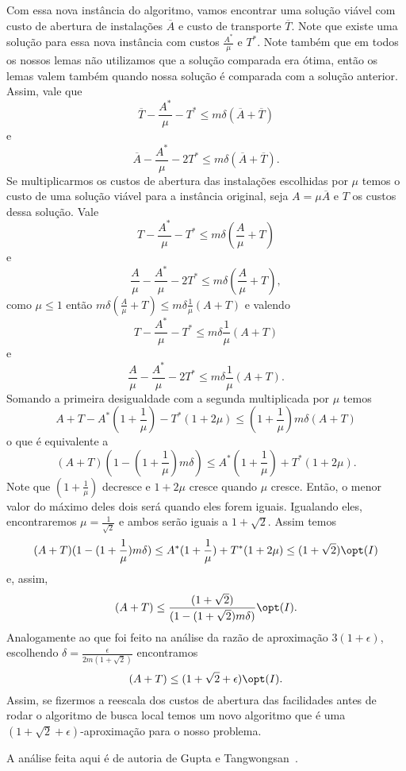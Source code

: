 Com essa nova instância do algoritmo, vamos encontrar uma solução viável com custo de abertura de instalações $\overline{A}$ e custo de transporte $\overline{T}$. Note que existe uma solução para essa nova instância com custos $\frac{A^*}{\mu}$ e $T^*$. Note também que em todos os nossos lemas não utilizamos  que a solução comparada era ótima, então os lemas valem também quando nossa solução é comparada com a solução anterior. Assim, vale que
\[ \overline{T} - \frac{A^*}{\mu} - T^* \leq m\delta(\overline{A} + \overline{T})\]
e
\[ \overline{A} - \frac{A^*}{\mu} - 2T^* \leq m\delta(\overline{A} + \overline{T}).\]
Se multiplicarmos os custos de abertura das instalações escolhidas por $\mu$ temos o custo de uma solução viável para a instância original, seja $A = \mu\overline{A}$ e $T$ os custos dessa solução. Vale
\[ T - \frac{A^*}{\mu} - T^* \leq m\delta(\frac{A}{\mu}+ T)\]
e
\[ \frac{A}{\mu} - \frac{A^*}{\mu} - 2T^* \leq m\delta(\frac{A}{\mu} + T),\]
como $\mu \leq 1$ então $m\delta(\frac{A}{\mu}+ T) \leq m\delta\frac{1}{\mu}( A + T)$ e valendo 
\[T - \frac{A^*}{\mu} - T^* \leq m\delta\frac{1}{\mu}( A + T) \] 
e 
\[ \frac{A}{\mu} - \frac{A^*}{\mu} - 2T^* \leq m\delta\frac{1}{\mu}( A + T) .\]
Somando a primeira desigualdade com a segunda multiplicada por $\mu$ temos
\[A + T - A^* (1 + \frac{1}{\mu}) - T^*(1 + 2\mu) \leq (1 + \frac{1}{\mu})m\delta(A+T)\]
o que é equivalente a 
\[(A+T)(1 - (1+\frac{1}{\mu})m\delta)\leq A^* (1 + \frac{1}{\mu}) + T^*(1 + 2\mu).\]
Note que $(1+\frac{1}{\mu})$ decresce e $1 + 2\mu$ cresce quando $\mu$ cresce. Então, o menor valor do máximo deles dois será quando eles forem iguais. Igualando eles, encontraremos $\mu = \frac{1}{\sqrt{2}}$ e ambos serão iguais a $1 + \sqrt{2}$. Assim temos
\[(A+T)(1 - (1+\frac{1}{\mu})m\delta)\leq A^* (1 + \frac{1}{\mu}) + T^*(1 + 2\mu) \leq (1+\sqrt{2})\opt(I)\]
e, assim, 
\[(A+T)\leq \frac{(1+\sqrt{2})}{(1 - (1+\sqrt{2 })m\delta)}\opt(I).\]
Analogamente ao que foi feito na análise da razão de aproximação $3(1 + \epsilon)$, escolhendo $\delta = \frac{\epsilon}{2m(1+\sqrt{2})}$ encontramos 
\[(A+T) \leq (1 + \sqrt{2} + \epsilon )\opt(I).\]
Assim, se fizermos a reescala dos custos de abertura das facilidades antes de rodar o algoritmo de busca local temos um novo algoritmo que é uma $(1 + \sqrt{2} + \epsilon )$-aproximação para o nosso problema.

A análise feita aqui é de autoria de Gupta e Tangwongsan~\cite{DBLP:journals/corr/abs-0809-2554}.